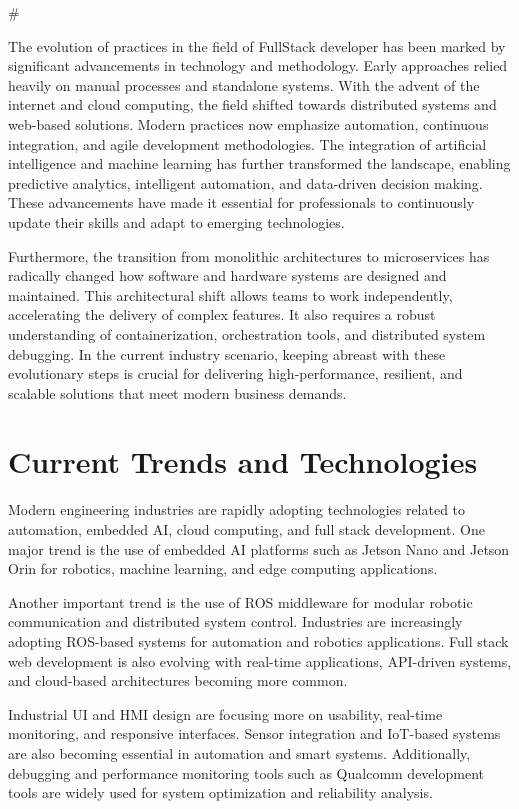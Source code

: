 \documentclass[12pt,a4paper]{report}
\begin{document}
\#


The evolution of practices in the field of FullStack developer has been marked by significant advancements in technology and methodology. Early approaches relied heavily on manual processes and standalone systems. With the advent of the internet and cloud computing, the field shifted towards distributed systems and web-based solutions. Modern practices now emphasize automation, continuous integration, and agile development methodologies. The integration of artificial intelligence and machine learning has further transformed the landscape, enabling predictive analytics, intelligent automation, and data-driven decision making. These advancements have made it essential for professionals to continuously update their skills and adapt to emerging technologies.


Furthermore, the transition from monolithic architectures to microservices has radically changed how software and hardware systems are designed and maintained. This architectural shift allows teams to work independently, accelerating the delivery of complex features. It also requires a robust understanding of containerization, orchestration tools, and distributed system debugging. In the current industry scenario, keeping abreast with these evolutionary steps is crucial for delivering high-performance, resilient, and scalable solutions that meet modern business demands.


\section{Current Trends and Technologies}

Modern engineering industries are rapidly adopting technologies related to automation, embedded AI, cloud computing, and full stack development. One major trend is the use of embedded AI platforms such as Jetson Nano and Jetson Orin for robotics, machine learning, and edge computing applications.


Another important trend is the use of ROS middleware for modular robotic communication and distributed system control. Industries are increasingly adopting ROS-based systems for automation and robotics applications. Full stack web development is also evolving with real-time applications, API-driven systems, and cloud-based architectures becoming more common.


Industrial UI and HMI design are focusing more on usability, real-time monitoring, and responsive interfaces. Sensor integration and IoT-based systems are also becoming essential in automation and smart systems. Additionally, debugging and performance monitoring tools such as Qualcomm development tools are widely used for system optimization and reliability analysis.
\end{document}
